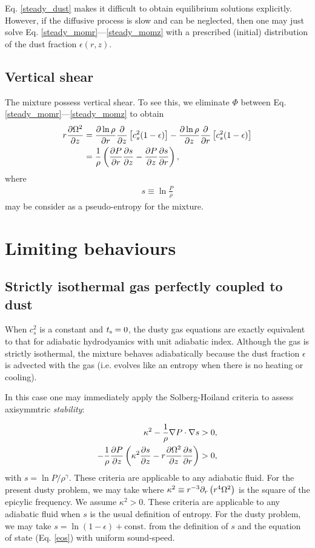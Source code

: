 Eq. \ref{steady_dust} makes it difficult to obtain equilibrium
solutions explicitly. However, if the diffusive process is slow and
can be neglected, then one may just solve
Eq. \ref{steady_momr}---\ref{steady_momz} with a prescribed (initial)
distribution of the dust fraction $\epsilon(r,z)$. 

\subsection{Vertical shear}
The mixture possess vertical shear. To see this, we eliminate $\Phi$
between Eq. \ref{steady_momr}---\ref{steady_momz} to 
obtain 
\begin{align}\label{vshear}
  r\frac{\partial \Omega^2}{\partial z} &= \frac{\partial\ln{\rho}}{\partial r}\frac{\partial}{\partial
    z}\left[c_s^2(1-\epsilon)\right] - \frac{\partial\ln{\rho}}{\partial z}
  \frac{\partial}{\partial r} \left[c_s^2(1-\epsilon)\right]\\  
  & = \frac{1}{\rho}\left(\frac{\partial P}{\partial r}\frac{\partial s}{\partial z} -\frac{\partial
    P}{\partial z}\frac{\partial s}{\partial r} \right),\notag
\end{align}
where
\begin{align}
   s \equiv \ln \frac{P}{\rho}
\end{align}
may be consider as a pseudo-entropy for the mixture. 

\section{Limiting behaviours}

\subsection{Strictly isothermal gas perfectly coupled to dust}  
When $c_s^2$ is a constant and $t_\mathrm{s}=0$, the dusty gas equations are
exactly equivalent to that for adiabatic hydrodyamics with unit adiabatic
index. Although the gas is strictly isothermal, the mixture behaves 
adiabatically because the dust fraction $\epsilon$ is advected with
the gas (i.e. evolves like an entropy when there is no heating or
cooling). 

In this case one may immediately apply the Solberg-Hoiland
criteria to assess axisymmtric \emph{stability}:  

\begin{align}
  \kappa^2 - \frac{1}{\rho}\nabla P \cdot \nabla s &> 0,\\
  -\frac{1}{\rho}\frac{\partial P}{\partial z} \left(\kappa^2 \frac{\partial s}{\partial z} -
  r\frac{\partial\Omega^2}{\partial z}\frac{\partial s}{\partial r}\right) &>0, 
\end{align}
with $s = \ln{P/\rho^\gamma}$. These criteria are applicable to any adiabatic fluid. 
For the present dusty problem, we may take 
where $\kappa^2 \equiv r^{-3}\partial_r\left(r^4\Omega^2\right)$ is the
square of the epicylic frequency. We assume $\kappa^2>0$. 
These criteria are applicable to any adiabatic fluid when $s$
is the usual definition of entropy. For the dusty problem, we may take 
$s=\ln{(1-\epsilon)}+\mathrm{const.}$ from the definition of $s$ and  
the equation of state (Eq. \ref{eos}) with uniform sound-speed. 

